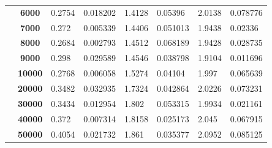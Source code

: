 \documentclass{article}
\begin{document}
\begin{table}[]
\begin{tabular}{|c|c|ll|ll|ll|}
                                       & \textbf{6000}                     & \multicolumn{1}{l|}{0.2754}        & 0.018202                          & \multicolumn{1}{l|}{1.4128}        & 0.05396                           & \multicolumn{1}{l|}{2.0138}        & 0.078776                          \\ \cline{2-8} 
                                       & \textbf{7000}                     & \multicolumn{1}{l|}{0.272}         & 0.005339                          & \multicolumn{1}{l|}{1.4406}        & 0.051013                          & \multicolumn{1}{l|}{1.9438}        & 0.02336                           \\ \cline{2-8} 
                                       & \textbf{8000}                     & \multicolumn{1}{l|}{0.2684}        & 0.002793                          & \multicolumn{1}{l|}{1.4512}        & 0.068189                          & \multicolumn{1}{l|}{1.9428}        & 0.028735                          \\ \cline{2-8} 
                                       & \textbf{9000}                     & \multicolumn{1}{l|}{0.298}         & 0.029589                          & \multicolumn{1}{l|}{1.4546}        & 0.038798                          & \multicolumn{1}{l|}{1.9104}        & 0.011696                          \\ \cline{2-8} 
                                       & \textbf{10000}                    & \multicolumn{1}{l|}{0.2768}        & 0.006058                          & \multicolumn{1}{l|}{1.5274}        & 0.04104                           & \multicolumn{1}{l|}{1.997}         & 0.065639                          \\ \cline{2-8} 
                                       & \textbf{20000}                    & \multicolumn{1}{l|}{0.3482}        & 0.032935                          & \multicolumn{1}{l|}{1.7324}        & 0.042864                          & \multicolumn{1}{l|}{2.0226}        & 0.073231                          \\ \cline{2-8} 
                                       & \textbf{30000}                    & \multicolumn{1}{l|}{0.3434}        & 0.012954                          & \multicolumn{1}{l|}{1.802}         & 0.053315                          & \multicolumn{1}{l|}{1.9934}        & 0.021161                          \\ \cline{2-8} 
                                       & \textbf{40000}                    & \multicolumn{1}{l|}{0.372}         & 0.007314                          & \multicolumn{1}{l|}{1.8158}        & 0.025173                          & \multicolumn{1}{l|}{2.045}         & 0.067915                          \\ \cline{2-8} 
                                       & \textbf{50000}                    & \multicolumn{1}{l|}{0.4054}        & 0.021732                          & \multicolumn{1}{l|}{1.861}         & 0.035377                          & \multicolumn{1}{l|}{2.0952}        & 0.085125                          \\ \hline
\end{tabular}
\end{table}
\newpage\
\end{document}
